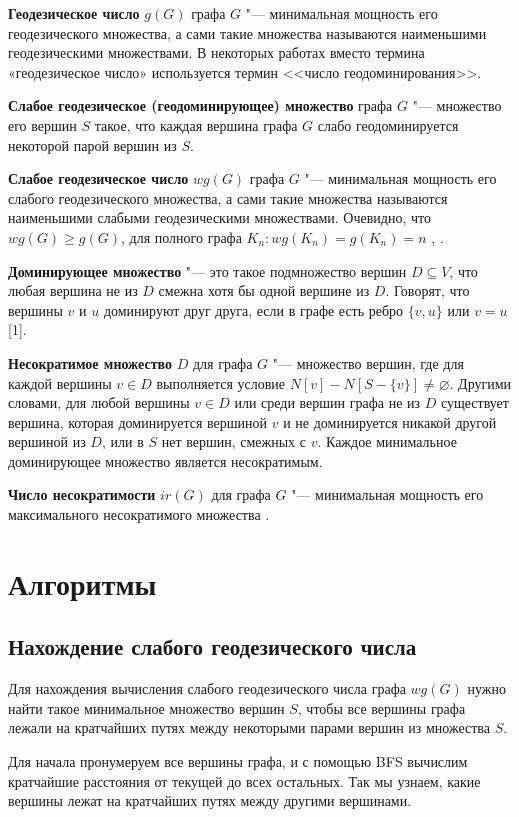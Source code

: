 \documentclass[bachelor, och, nir]{SCWorks}
\begin{document}
\textbf{Геодезическое число} $g(G)$ графа $G$ "--- минимальная мощность 
его геодезического множества, а сами такие множества называются наименьшими 
геодезическими множествами. В некоторых работах вместо термина «геодезическое число» используется
термин <<число геодоминирования>>.

\textbf{Слабое геодезическое (геодоминирующее) множество} графа $G$ "---
множество его вершин $S$ такое, что каждая вершина графа $G$
слабо геодоминируется некоторой парой вершин из $S$. 

\textbf{Слабое геодезическое число} $wg(G)$ графа $G$ "---  минимальная мощность его слабого геодезического множества, а сами такие множества называются
наименьшими слабыми геодезическими множествами. Очевидно, что
$wg(G) \ge g(G)$, для полного графа $K_n: wg(K_n) = g(K_n) = n$    \cite{rad2008strong}, \cite{rad2008weak}.

 \textbf{Доминирующее множество} "--- это такое подмножество вершин $D \subseteq V$, 
 что любая вершина не из $D$ смежна хотя бы одной вершине из $D$. Говорят, 
 что вершины $v$ и $u$ доминируют друг друга, если в графе есть ребро $\{v, u\}$ или $v = u$[1].


\textbf{Несократимое множество} $D$ для графа $G$ "--- множество вершин, где для каждой
 вершины $v \in D$ выполняется условие $N[v] - N[S - \{v\}] \neq \varnothing$. 
 Другими словами, для любой вершины $v \in D$ или среди вершин графа не из $D$
 существует вершина, которая доминируется вершиной $v$ и не доминируется никакой 
 другой вершиной из $D$, или в $S$ нет вершин, смежных с $v$. Каждое минимальное 
 доминирующее множество является несократимым.

\textbf{Число несократимости} $ir(G)$ для графа $G$ "--- минимальная
мощность его максимального несократимого множества \cite{cockayne1978}.


\section{Алгоритмы} 
\subsection{Нахождение слабого геодезического числа}

Для нахождения вычисления слабого геодезического числа графа $wg(G)$ нужно найти такое минимальное множество вершин $S$, чтобы все вершины графа лежали на кратчайших путях между некоторыми парами вершин из множества $S$.

Для начала пронумеруем все вершины графа, и с помощью BFS вычислим кратчайшие расстояния от текущей до всех остальных. Так мы узнаем, какие вершины лежат на кратчайших путях между другими вершинами.
\end{document}
